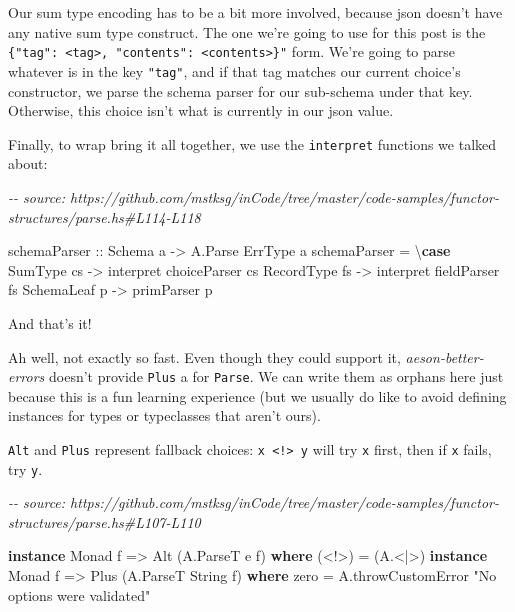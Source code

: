 \documentclass[]{article}
\newenvironment{Shaded}{}{}
\newcommand{\CommentTok}[1]{\textcolor[rgb]{0.38,0.63,0.69}{\textit{#1}}}
\newcommand{\DataTypeTok}[1]{\textcolor[rgb]{0.56,0.13,0.00}{#1}}
\newcommand{\KeywordTok}[1]{\textcolor[rgb]{0.00,0.44,0.13}{\textbf{#1}}}
\newcommand{\NormalTok}[1]{#1}
\newcommand{\OperatorTok}[1]{\textcolor[rgb]{0.40,0.40,0.40}{#1}}
\newcommand{\OtherTok}[1]{\textcolor[rgb]{0.00,0.44,0.13}{#1}}
\newcommand{\StringTok}[1]{\textcolor[rgb]{0.25,0.44,0.63}{#1}}
\begin{document}
Our sum type encoding has to be a bit more involved, because json doesn't have
any native sum type construct. The one we're going to use for this post is the
\texttt{\{"tag":\ \textless{}tag\textgreater{},\ "contents":\ \textless{}contents\textgreater{}\}"}
form. We're going to parse whatever is in the key \texttt{"tag"}, and if that
tag matches our current choice's constructor, we parse the schema parser for our
sub-schema under that key. Otherwise, this choice isn't what is currently in our
json value.

Finally, to wrap bring it all together, we use the \texttt{interpret} functions
we talked about:

\begin{Shaded}
\begin{Highlighting}[]
\CommentTok{{-}{-} source: https://github.com/mstksg/inCode/tree/master/code{-}samples/functor{-}structures/parse.hs\#L114{-}L118}

\OtherTok{schemaParser ::} \DataTypeTok{Schema}\NormalTok{ a }\OtherTok{{-}>} \DataTypeTok{A.Parse} \DataTypeTok{ErrType}\NormalTok{ a}
\NormalTok{schemaParser }\OtherTok{=}\NormalTok{ \textbackslash{}}\KeywordTok{case}
    \DataTypeTok{SumType}\NormalTok{    cs }\OtherTok{{-}>}\NormalTok{ interpret choiceParser cs}
    \DataTypeTok{RecordType}\NormalTok{ fs }\OtherTok{{-}>}\NormalTok{ interpret fieldParser fs}
    \DataTypeTok{SchemaLeaf}\NormalTok{ p  }\OtherTok{{-}>}\NormalTok{ primParser p}
\end{Highlighting}
\end{Shaded}

And that's it!

Ah well, not exactly so fast. Even though they could support it,
\emph{aeson-better-errors} doesn't provide \texttt{Plus} a for \texttt{Parse}.
We can write them as orphans here just because this is a fun learning experience
(but we usually do like to avoid defining instances for types or typeclasses
that aren't ours).

\texttt{Alt} and \texttt{Plus} represent fallback choices:
\texttt{x\ \textless{}!\textgreater{}\ y} will try \texttt{x} first, then if
\texttt{x} fails, try \texttt{y}.

\begin{Shaded}
\begin{Highlighting}[]
\CommentTok{{-}{-} source: https://github.com/mstksg/inCode/tree/master/code{-}samples/functor{-}structures/parse.hs\#L107{-}L110}

\KeywordTok{instance} \DataTypeTok{Monad}\NormalTok{ f }\OtherTok{=>} \DataTypeTok{Alt}\NormalTok{ (}\DataTypeTok{A.ParseT}\NormalTok{ e f) }\KeywordTok{where}
\NormalTok{    (}\OperatorTok{<!>}\NormalTok{) }\OtherTok{=}\NormalTok{ (}\OperatorTok{A.<|>}\NormalTok{)}
\KeywordTok{instance} \DataTypeTok{Monad}\NormalTok{ f }\OtherTok{=>} \DataTypeTok{Plus}\NormalTok{ (}\DataTypeTok{A.ParseT} \DataTypeTok{String}\NormalTok{ f) }\KeywordTok{where}
\NormalTok{    zero  }\OtherTok{=}\NormalTok{ A.throwCustomError }\StringTok{"No options were validated"}
\end{Highlighting}
\end{Shaded}
\end{document}
